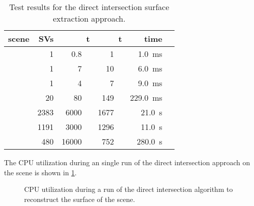 \begin{table}
	\centering
	\begin{tabular}{lrrrrr}
		scene         &  SVs &                 t\sub{in} &               t\sub{out} &                               {time} &  \\
		\midrule
		\cubes        &    1 & \SI{  0.8}{\kilo\nothing} & \SI{   1}{\kilo\nothing} &            \SI{  1.0}{\milli\second} &  \\
		\cylindersd   &    1 & \SI{    7}{\kilo\nothing} & \SI{  10}{\kilo\nothing} &            \SI{  6.0}{\milli\second} &  \\
		\cylinders    &    1 & \SI{    4}{\kilo\nothing} & \SI{   7}{\kilo\nothing} &            \SI{  9.0}{\milli\second} &  \\
		\cylinderhead &   20 & \SI{   80}{\kilo\nothing} & \SI{ 149}{\kilo\nothing} &            \SI{229.0}{\milli\second} &  \\
		\impeller     & 2383 & \SI{ 6000}{\kilo\nothing} & \SI{1677}{\kilo\nothing} & \SI{ 21.0}{      \second}\phantom{m} &  \\
		\impellerhalf & 1191 & \SI{ 3000}{\kilo\nothing} & \SI{1296}{\kilo\nothing} & \SI{ 11.0}{      \second}\phantom{m} &  \\
		\turbine      &  480 & \SI{16000}{\kilo\nothing} & \SI{ 752}{\kilo\nothing} & \SI{280.0}{      \second}\phantom{m} &
	\end{tabular}
	\caption[Direct intersection results]{
		Test results for the direct intersection surface extraction approach.
	}
	\label{tbl:direct_intersection_results}
\end{table}

The CPU utilization during an single run of the direct intersection approach on the \impeller scene is shown in \cref{fig:di_cpu}.

\begin{figure}
	\centering
	\caption[Direct intersection CPU utilization]{
		CPU utilization during a run of the direct intersection algorithm to reconstruct the surface of the \impeller scene.
	}
	\label{fig:di_cpu}
\end{figure}

